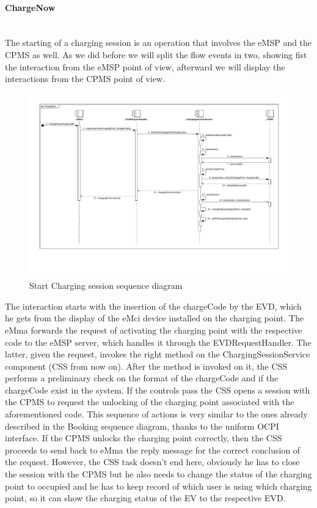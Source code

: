 \paragraph{ChargeNow}\mbox{}\\
The starting of a charging session is an operation that involves the eMSP and the CPMS as well. As we did before we will split the flow events in two, showing fist the interaction from the eMSP point of view, afterward we will display the interactions from the CPMS point of view.
\begin{figure}[H]
    \centering
    \includegraphics[trim={0 3cm 0 1cm},clip, width=1\textwidth]{Images/cp2/runtime/ChargeNow_emsp_view.pdf}
    \caption{Start Charging session sequence diagram}
\end{figure}
The interaction starts with the insertion of the chargeCode by the EVD, which he gets from the display of the eMci device installed on the charging point. The eMma forwards the request of activating the charging point with the respective code to the eMSP server, which handles it through the EVDRequestHandler. The latter, given the request, invokes the right method on the ChargingSessionService component (CSS from now on). After the method is invoked on it, the CSS performs a preliminary check on the format of the chargeCode and if the chargeCode exist in the system. If the controls pass the CSS opens a session with the CPMS to request the unlocking of the charging point associated with the aforementioned code. This sequence of actions is very similar to the ones already described in the Booking sequence diagram, thanks to the uniform OCPI interface. If the CPMS unlocks the charging point correctly, then the CSS proceeds to send back to eMma the reply message for the correct conclusion of the request. However, the CSS task doesn't end here, obviously he has to close the session with the CPMS but he also needs to change the status of the charging point to occupied and he has to keep record of which user is using which charging point, so it can show the charging status of the EV to the respective EVD.

